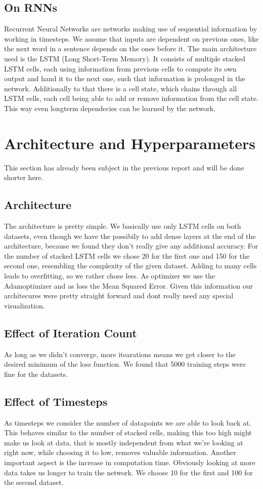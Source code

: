 \documentclass{article}
\begin{document}
\subsection{On RNNs}
Recurrent Neural Networks are networks making use of sequential information by working in timesteps. We assume that inputs are dependent on previous ones, like the next word in a sentence depends on the ones before it. The main architecture used is the LSTM (Long Short-Term Memory). It consists of multiple stacked LSTM cells, each using information from previous cells to compute its own output and hand it to the next one, such that information is prolonged in the network. Additionally to that there is a cell state, which chains through all LSTM cells, each cell being able to add or remove information from the cell state. This way even longterm dependecies can be learned by the network.

\section{Architecture and Hyperparameters}
This section has already been subject in the previous report and will be done shorter here.
\subsection{Architecture}
The architecture is pretty simple. We basically use only LSTM cells on both datasets, even though we have the possibily to add dense layers at the end of the architecture, because we found they don't really give any additional accuracy. For the number of stacked LSTM cells we chose 20 for the first one and 150 for the second one, resembling the complexity of the given dataset. Adding to many cells leads to overfitting, so we rather chose less. As optimizer we use the Adamoptimizer and as loss the Mean Squared Error. Given this information our architecures were pretty straight forward and dont really need any special visualization.
\subsection{Effect of Iteration Count}
As long as we didn't converge, more itearations means we get closer to the desired minimum of the loss function. We found that 5000 training steps were fine for the datasets.

\subsection{Effect of Timesteps}
As timesteps we consider the number of datapoints we are able to look back at. This behaves similar to the number of stacked cells, making this too high might make us look at data, that is mostly independent from what we're looking at right now, while choosing it to low, removes valuable information. Another important aspect is the increase in computation time. Obviously looking at more data takes us longer to train the network. We choose 10 for the first and 100 for the second dataset.
\newpage
\end{document}
